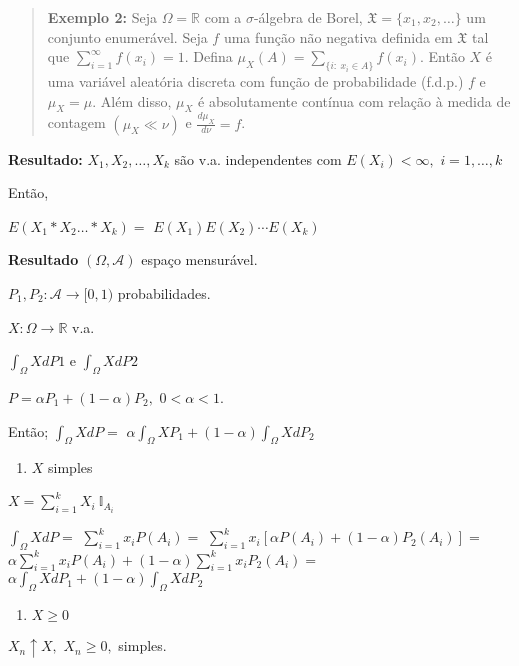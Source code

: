 \documentclass[
]{book}
\providecommand{\tightlist}{%
  \setlength{\itemsep}{0pt}\setlength{\parskip}{0pt}}
\begin{document}
\(~\)

\begin{quote}
\textbf{Exemplo 2:} Seja \(\Omega=\mathbb{R}\) com a \(\sigma\)-álgebra de Borel, \(\mathfrak{X} = \{x_1,x_2,\ldots\}\) um conjunto enumerável. Seja \(f\) uma função não negativa definida em \(\mathfrak{X}\) tal que \(\displaystyle \sum_{i=1}^{\infty} f(x_i) = 1\). Defina \(\displaystyle \mu_X(A) = \sum_{\{i:~x_i \in A\}} f(x_i)\). Então \(X\) é uma variável aleatória discreta com função de probabilidade (f.d.p.) \(f\) e \(\mu_X=\mu\). Além disso, \(\mu_X\) é absolutamente contínua com relação à medida de contagem \((\mu_X \ll \nu)\) e \(\frac{d\mu_X}{d\nu}=f\).
\end{quote}

\textbf{Resultado:} \(X_1,X_2,\ldots,X_k\) são v.a. independentes com \(E(X_i)<\infty,\) \(i=1,\ldots,k\)

Então,

\(E(X_1*X_2\dots*X_k) =\) \(E(X_1)E(X_2)\cdots E(X_k)\)

\textbf{Resultado} \((\Omega,\mathcal{A})\) espaço mensurável.

\(P_1,P_2: \mathcal{A}\longrightarrow [0,1)\) probabilidades.

\(X: \Omega \longrightarrow \mathbb{R}\) v.a.

\(\int_\Omega X dP1\) e \(\int_\Omega X dP2\)

\(P=\alpha P_1 +(1-\alpha)P_2,\) \(0<\alpha<1.\)

Então; \(\int_\Omega XdP =\) \(\alpha \int_\Omega XP_1 + (1-\alpha)\int_\Omega XdP_2\)

\begin{enumerate}
\def\labelenumi{\arabic{enumi}.}
\tightlist
\item
  \(X\) simples
\end{enumerate}

\(X=\sum_{i=1}^kX_i~\mathbb{I}_{A_i}\)

\(\int_\Omega XdP=\) \(\sum_{i=1}^kx_iP(A_i)=\) \(\sum_{i=1}^k x_i[\alpha P(A_i)+(1-\alpha)P_2(A_i)]=\) \(\alpha \sum_{i=1}^k x_iP(A_i)+(1-\alpha)\sum_{i=1}^k x_iP_2(A_i)=\) \(\alpha \int_\Omega XdP_1+(1-\alpha)\int_\Omega XdP_2\)

\begin{enumerate}
\def\labelenumi{\arabic{enumi}.}
\setcounter{enumi}{1}
\tightlist
\item
  \(X \geq 0\)
\end{enumerate}

\(X_n \uparrow X,\) \(X_n \geq 0,\) simples.
\end{document}
